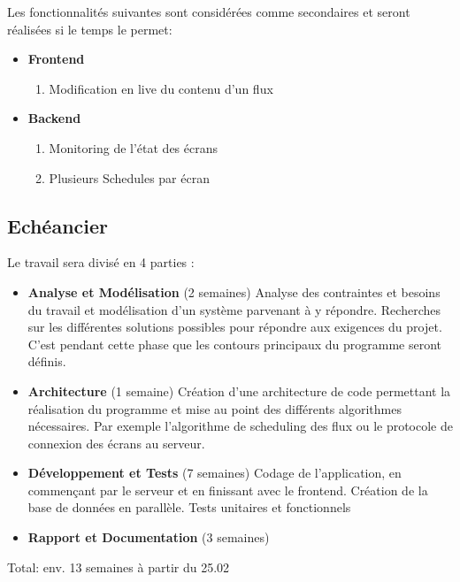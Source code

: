 \documentclass[french]{article}
\begin{document}
\begin{appendices}
Les fonctionnalités suivantes sont considérées comme secondaires et seront réalisées si le temps le permet:
\begin{itemize}
	\item \textbf{Frontend}
	\begin{enumerate}
		\item Modification en live du contenu d'un flux
	\end{enumerate}
	\item \textbf{Backend}
	\begin{enumerate}
		\item Monitoring de l'état des écrans 
		\item Plusieurs Schedules par écran
	\end{enumerate}
\end{itemize}

\subsection{Echéancier}

Le travail sera divisé en 4 parties :
\begin{itemize}
	\item \textbf{Analyse et Modélisation} (2 semaines) \newline
	Analyse des contraintes et besoins du travail et modélisation d'un système parvenant à y répondre. Recherches sur les différentes solutions possibles pour répondre aux exigences du projet. C'est pendant cette phase que les contours principaux du programme seront définis.
	\item \textbf{Architecture} (1 semaine) \newline
	Création d'une architecture de code permettant la réalisation du programme et mise au point des différents algorithmes nécessaires. Par exemple l'algorithme de scheduling des flux ou le protocole de connexion des écrans au serveur.
	\item \textbf{Développement et Tests} (7 semaines) \newline
	Codage de l'application, en commençant par le serveur et en finissant avec le frontend. 
	Création de la base de données en parallèle.
	Tests unitaires et fonctionnels
	\item \textbf{Rapport et Documentation} (3 semaines) \newline
	\end{itemize}
	
Total: env. 13 semaines à partir du 25.02 \newpage
 

\end{appendices}
\end{document}
